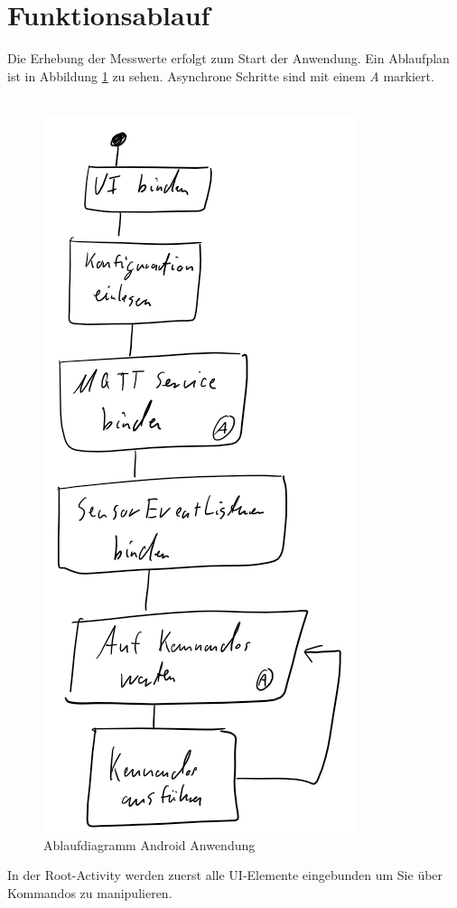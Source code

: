 \documentclass[11pt,a4paper]{report}
\begin{document}
\section{Funktionsablauf}
Die Erhebung der Messwerte erfolgt zum Start der Anwendung.
Ein Ablaufplan ist in Abbildung \ref{fig:app_flow} zu sehen.
Asynchrone Schritte sind mit einem \textit{A} markiert.
\\\\
\begin{figure}[htbp]
  \centering
  \includegraphics[height=0.8\textheight]{images/app_ablauf.png}
  \caption{Ablaufdiagramm Android Anwendung}
  \label{fig:app_flow}
\end{figure}
In der Root-Activity werden zuerst alle UI-Elemente eingebunden um Sie über Kommandos zu manipulieren.
\end{document}
